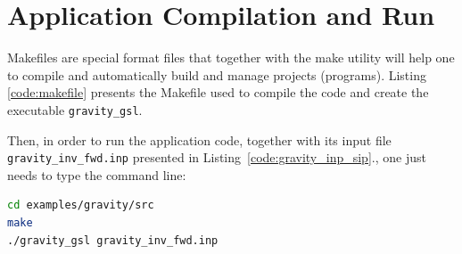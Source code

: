 \section{Application Compilation and Run}\label{sec:application_compilation}


Makefiles are special format files that together with the make utility will help one to compile and automatically build and manage projects (programs).
Listing \ref{code:makefile} presents the Makefile used to compile the code and create the executable \verb+gravity_gsl+.



Then, in order to run the application code, together with its input file \verb+gravity_inv_fwd.inp+ presented in Listing~\ref{code:gravity_inp_sip}., one just needs to type the command line:

\begin{lstlisting}[caption={}, label={},language={bash}]
cd examples/gravity/src
make
./gravity_gsl gravity_inv_fwd.inp
\end{lstlisting}



